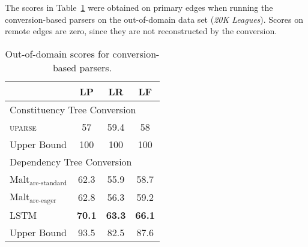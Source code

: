 \documentclass[11pt]{article}
\newcommand{\tabref}[1]{Table~\ref{#1}}
\begin{document}
The scores in \tabref{table:results_conv_ood} were obtained on primary edges
when running the conversion-based parsers on the out-of-domain data set
(\textit{20K Leagues}). Scores on remote edges are zero, since they are not
reconstructed by the conversion.
\begin{table}
  \centering
\begin{tabular}{l|ccc}
& \textbf{LP} & \textbf{LR} & \textbf{LF} \\
\hline
\multicolumn{4}{l}{\rule{0pt}{2ex} \footnotesize Constituency Tree Conversion} \\
\textsc{uparse} & 57 & 59.4 & 58 \\
Upper Bound & 100 & 100 & 100 \\
\hline
\multicolumn{4}{l}{\rule{0pt}{4ex} \footnotesize Dependency Tree Conversion} \\
Malt$_{\textrm{arc-standard}}$ & 62.3 & 55.9 & 58.7 \\
Malt$_{\textrm{arc-eager}}$ & 62.8 & 56.3 & 59.2 \\
LSTM & {\bf 70.1} & {\bf 63.3} & {\bf 66.1} \\
Upper Bound & 93.5 & 82.5 & 87.6 \\
\end{tabular}
\caption{Out-of-domain scores for conversion-based parsers.
\label{table:results_conv_ood}
}
\end{table}
\end{document}

